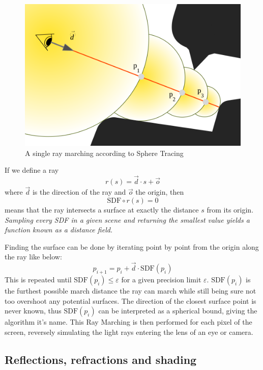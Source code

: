 		\vspace{40pt}
		\begin{figure}
			\begin{flushright}
				\includegraphics[width=0.9\linewidth]{figure/SDF2} 
			\end{flushright}
			\caption{A single ray marching according to Sphere Tracing}
			\vspace{40pt}
		\end{figure}

		If we define a ray $$r(s) = \vec{d} \cdot s + \vec{o}$$
		where $\vec{d}$ is the direction of the ray and $\vec{o}$ the origin, then
		$$\text{SDF}\circ r(s) = 0$$ means that the ray intersects a surface at
		exactly the distance $s$ from its origin. \emph{Sampling every SDF in a
		given scene and returning the smallest value yields a function known as a
		distance field.}

		\bigskip \noindent Finding the surface can be done by iterating point by
		point from the origin along the ray like below: $$p_{i+1} = p_i +
		\vec{d}\cdot \text{SDF}(p_i)$$ This is repeated until $\text{SDF}(p_i) \leq
		\varepsilon$ for a given precision limit $\varepsilon$. $\text{SDF}(p_i)$
		is the furthest possible march distance the ray can march while still being
		sure not too overshoot any potential surfaces. The direction of the closest
		surface point is never known, thus $\text{SDF}(p_i)$ can be interpreted as
		a spherical bound, giving the algorithm it's name. This Ray Marching is
		then performed for each pixel of the screen, reversely simulating the light
		rays entering the lens of an eye or camera.

			\subsection{Reflections, refractions and shading}

